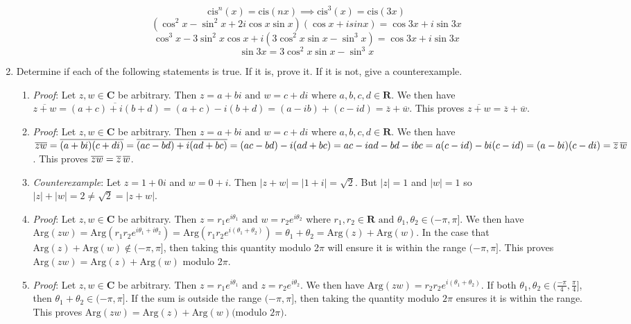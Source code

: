 \documentclass{article}
\newcommand{\R}{\mathbf{R}}
\newcommand{\C}{\mathbf{C}}
\begin{document}
\begin{enumerate}
	\[ \text{cis}^n(x)=\text{cis}(nx) \implies \text{cis}^3(x)=\text{cis}(3x) \] 
	\[ (\cos^2{x}-\sin^2{x}+2i\cos{x}\sin{x})(\cos{x}+isin{x})=\cos{3x}+i\sin{3x}\]
	\[ \cos^3{x}-3\sin^2{x}\cos{x}+i(3\cos^2{x}\sin{x}-\sin^3{x})=\cos{3x}+i\sin{3x}\]
	\[ \sin{3x}=3\cos^2{x}\sin{x}-\sin^3{x}\]
	
	\item Determine if each of the following statements is true.  If it is,  prove it.  If it is not,  give a counterexample.
	\begin{enumerate}
		\item \textit{Proof}: Let $z,w \in \C$ be arbitrary. Then $z=a+bi \text{ and } w=c+di \text{ where } a,b,c,d \in \R$. We then have $\overline{z+w}=\overline{(a+c)+i(b+d)}=(a+c)-i(b+d)=(a-ib)+(c-id)=\overline{z}+\overline{w}$. This proves $\overline{z+w}=\overline{z}+\overline{w}$.
		
		\item \textit{Proof}: Let $z,w \in \C$ be arbitrary. Then $z=a+bi \text{ and } w=c+di$ where $a,b,c,d \in \R$. We then have $\overline{zw} = \overline{(a+bi)(c+di)} =  \overline{(ac-bd)+i(ad+bc)}=(ac-bd)-i(ad+bc)=ac-iad-bd-ibc=a(c-id)-bi(c-id)=(a-bi)(c-di)=\overline{z} \thinspace \overline{w}$. This proves $ \overline{zw}= \overline{z} \thinspace \overline{w}$.
		
		\item \textit{Counterexample}: Let $z=1+0i$ and $w = 0+i$. Then $|z+w| = |1+i| = \sqrt{2}$. But $|z|=1$ and $|w|=1$ so $|z|+|w|=2\neq\sqrt{2}=|z+w|$. 
		
		\item \textit{Proof}: Let $z,w \in \C$ be arbitrary. Then $z=r_1e^{i\theta_1} \text{ and } w=r_2e^{i\theta_2}$ where $r_1,r_2 \in \R \text{ and } \theta_1,\theta_2 \in (-\pi,\pi]$. We then have $\text{Arg}(zw)=\text{Arg}(r_1r_2e^{i\theta_1+i\theta_2})=\text{Arg}(r_1r_2e^{i(\theta_1+\theta_2)})=\theta_1+\theta_2=\text{Arg}(z)+\text{Arg}(w)$. In the case that $\text{Arg}(z)+\text{Arg}(w) \notin (-\pi,\pi]$, then taking this quantity modulo 2$\pi$ will ensure it is within the range $(-\pi, \pi]$. This proves $\text{Arg}(zw)=\text{Arg}(z)+\text{Arg}(w)$ modulo 2$\pi$.
		
		\item \textit{Proof}: Let $z,w \in \C$ be arbitrary. Then $z=r_1e^{i\theta_1} \text{ and } z=r_2e^{i\theta_2}$. We then have $\text{Arg}(zw)=r_2 r_2e^{i(\theta_1+\theta_2)}$. If both $\theta_1,\theta_2 \in (\frac{-\pi}{4}, \frac{\pi}{4}]$, then $\theta_1+\theta_2\in (-\pi,\pi]$. If the sum is outside the range $(-\pi,\pi]$, then taking the quantity modulo $2\pi$ ensures it is within the range. This proves $\text{Arg}(zw)=\text{Arg}(z)+\text{Arg}(w) (\text{modulo }2\pi\text{)}$.
		

\end{enumerate}
\end{enumerate}
\end{document}
